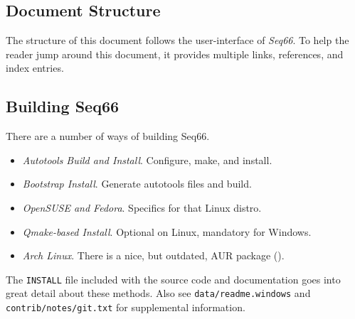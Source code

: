 \documentclass[
 11pt,
 twoside,
 a4paper,
 final                                 %
]{article}
\begin{document}
\subsection{Document Structure}
\label{subsec:introduction_document_structure}

   The structure of this document follows the user-interface of
   \textsl{Seq66}.
   To help the reader jump around this document, it provides
   multiple links, references, and index entries.

\subsection{Building Seq66}
\label{subsec:introduction_building_seq66}

   There are a number of ways of building Seq66.

   \begin{itemize}
      \item \textsl{Autotools Build and Install}.
         Configure, make, and install.
      \item \textsl{Bootstrap Install}.
         Generate autotools files and build.
      \item \textsl{OpenSUSE and Fedora}.
         Specifics for that Linux distro.
      \item \textsl{Qmake-based Install}.
         Optional on Linux, mandatory for Windows.
      \item \textsl{Arch Linux}.
         There is a nice, but outdated, AUR package (\cite{AUR}).
   \end{itemize}

   The \texttt{INSTALL} file included with the source code and
   documentation goes into great detail about these methods.
   Also see \texttt{data/readme.windows} and \texttt{contrib/notes/git.txt}
   for supplemental information.
















\end{document}
